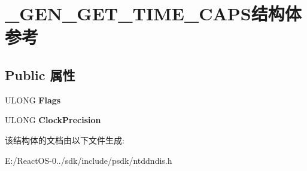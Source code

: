 \hypertarget{struct___g_e_n___g_e_t___t_i_m_e___c_a_p_s}{}\section{\+\_\+\+G\+E\+N\+\_\+\+G\+E\+T\+\_\+\+T\+I\+M\+E\+\_\+\+C\+A\+P\+S结构体 参考}
\label{struct___g_e_n___g_e_t___t_i_m_e___c_a_p_s}
\subsection*{Public 属性}
\begin{DoxyCompactItemize}
\item 
\mbox{\label{struct___g_e_n___g_e_t___t_i_m_e___c_a_p_s_a62c54824d4e3f5be1ea219ae3a936fee}} 
U\+L\+O\+NG {\bfseries Flags}
\item 
\mbox{\label{struct___g_e_n___g_e_t___t_i_m_e___c_a_p_s_acaf4ccdfed231b0a56f747ad0f576733}} 
U\+L\+O\+NG {\bfseries Clock\+Precision}
\end{DoxyCompactItemize}


该结构体的文档由以下文件生成\+:\begin{DoxyCompactItemize}
\item 
E\+:/\+React\+O\+S-\/0../sdk/include/psdk/ntddndis.\+h\end{DoxyCompactItemize}
